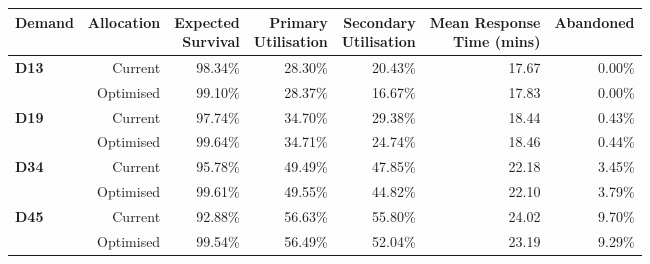 \begin{tabular}{lrrrrrr}
\toprule
Demand & Allocation & \specialcellr{Expected\\Survival} & \specialcellr{Primary\\Utilisation} & \specialcellr{Secondary\\Utilisation} & \specialcellr{Mean Response\\Time (mins)} & Abandoned \\
\midrule
\multirow{2}{*}{\textbf{D13}} & Current   & 98.34\% & 28.30\% & 20.43\% & 17.67 & 0.00\% \\
                              & Optimised & 99.10\% & 28.37\% & 16.67\% & 17.83 & 0.00\% \\
\midrule
\multirow{2}{*}{\textbf{D19}} & Current   & 97.74\% & 34.70\% & 29.38\% & 18.44 & 0.43\% \\
                              & Optimised & 99.64\% & 34.71\% & 24.74\% & 18.46 & 0.44\% \\
\midrule
\multirow{2}{*}{\textbf{D34}} & Current   & 95.78\% & 49.49\% & 47.85\% & 22.18 & 3.45\% \\
                              & Optimised & 99.61\% & 49.55\% & 44.82\% & 22.10 & 3.79\% \\
\midrule
\multirow{2}{*}{\textbf{D45}} & Current   & 92.88\% & 56.63\% & 55.80\% & 24.02 & 9.70\% \\
                              & Optimised & 99.54\% & 56.49\% & 52.04\% & 23.19 & 9.29\% \\
\bottomrule
\end{tabular}